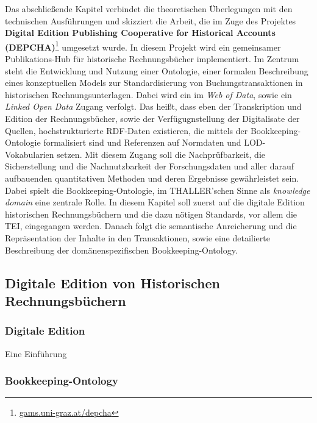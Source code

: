 \documentclass[12pt,a4paper]{article}
\begin{document}
Das abschließende Kapitel verbindet die theoretischen Überlegungen mit den technischen Ausführungen und skizziert die Arbeit, die im Zuge des Projektes \textbf{Digital Edition Publishing Cooperative for Historical Accounts (DEPCHA)}\footnote{\url{gams.uni-graz.at/depcha}} umgesetzt wurde. In diesem Projekt wird ein gemeinsamer Publikations-Hub für historische Rechnungsbücher implementiert. Im Zentrum steht die Entwicklung und Nutzung einer Ontologie, einer formalen Beschreibung eines konzeptuellen Models zur Standardisierung von Buchungstransaktionen in historischen Rechnungsunterlagen. Dabei wird ein im \textit{Web of Data}, sowie ein \textit{Linked Open Data} Zugang verfolgt. Das heißt, dass eben der Transkription und Edition der Rechnungsbücher, sowie der Verfügugnstellung der Digitalisate der Quellen, hochstrukturierte RDF-Daten existieren, die mittels der Bookkeeping-Ontologie formalisiert sind und Referenzen auf Normdaten und LOD-Vokabularien setzen. Mit diesem Zugang soll die Nachprüfbarkeit, die Sicherstellung und die Nachnutzbarkeit der Forschungsdaten und aller darauf aufbauenden quantitativen Methoden und deren Ergebnisse gewährleistet sein. Dabei spielt die Bookkeeping-Ontologie, im THALLER'schen Sinne als \textit{knowledge domain} eine zentrale Rolle. In diesem Kapitel soll zuerst auf die digitale Edition historischen Rechnungsbüchern und die dazu nötigen Standards, vor allem die TEI, eingegangen werden. Danach folgt die semantische Anreicherung und die Repräsentation der Inhalte in den Transaktionen, sowie eine detailierte Beschreibung der domänenspezifischen Bookkeeping-Ontology.  

\subsection{Digitale Edition von Historischen Rechnungsbüchern}
\subsubsection{Digitale Edition}
Eine Einführung

\subsubsection{Bookkeeping-Ontology}
\end{document}
